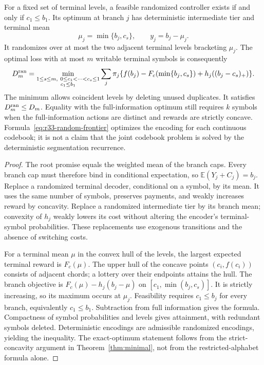 \begin{theorem}\label{thm:r33-lotteries}
For a fixed set of terminal levels, a feasible randomized controller exists if and only if $c_1\leq b_1$. Its optimum at branch $j$ has deterministic intermediate tier and terminal mean
\[
 \mu_j=\min\{b_j,c_s\},\qquad y_j=b_j-\mu_j.
\]
It randomizes over at most the two adjacent terminal levels bracketing $\mu_j$. The optimal loss with at most $m$ writable terminal symbols is consequently
\begin{equation}\label{eq:r33-random-frontier}
 D_m^{\rm ran}=\min_{\substack{1\leq s\leq m,\ 0\leq c_1<\cdots<c_s\leq1\\c_1\leq b_1}}
 \sum_j\pi_j\{f(b_j)-F_c(\min\{b_j,c_s\})+h_j((b_j-c_s)_+)\}.
\end{equation}
The minimum allows coincident levels by deleting unused duplicates. It satisfies $D_m^{\rm ran}\leq D_m$. Equality with the full-information optimum still requires $k$ symbols when the full-information actions are distinct and rewards are strictly concave. Formula~\eqref{eq:r33-random-frontier} optimizes the encoding for each continuous codebook; it is not a claim that the joint codebook problem is solved by the deterministic segmentation recurrence.
\end{theorem}
\begin{proof}
The root promise equals the weighted mean of the branch caps. Every branch cap must therefore bind in conditional expectation, so $\mathbb E(Y_j+C_j)=b_j$. Replace a randomized terminal decoder, conditional on a symbol, by its mean. It uses the same number of symbols, preserves payments, and weakly increases reward by concavity. Replace a randomized intermediate tier by its branch mean; convexity of $h_j$ weakly lowers its cost without altering the encoder's terminal-symbol probabilities. These replacements use exogenous transitions and the absence of switching costs.

For a terminal mean $\mu$ in the convex hull of the levels, the largest expected terminal reward is $F_c(\mu)$. The upper hull of the concave points $(c_i,f(c_i))$ consists of adjacent chords; a lottery over their endpoints attains the hull. The branch objective is $F_c(\mu)-h_j(b_j-\mu)$ on $[c_1,\min(b_j,c_s)]$. It is strictly increasing, so its maximum occurs at $\mu_j$. Feasibility requires $c_1\leq b_j$ for every branch, equivalently $c_1\leq b_1$. Subtraction from full information gives the formula. Compactness of symbol probabilities and levels gives attainment, with redundant symbols deleted. Deterministic encodings are admissible randomized encodings, yielding the inequality. The exact-optimum statement follows from the strict-concavity argument in Theorem~\ref{thm:minimal}, not from the restricted-alphabet formula alone.
\end{proof}

